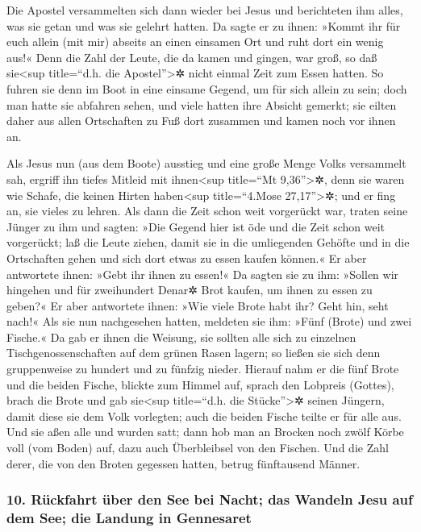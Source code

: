  Die Apostel versammelten sich dann wieder bei Jesus und
berichteten ihm alles, was sie getan und was sie gelehrt hatten.
 Da sagte er zu ihnen: »Kommt ihr für euch allein (mit
mir) abseits an einen einsamen Ort und ruht dort ein wenig aus!« Denn
die Zahl der Leute, die da kamen und gingen, war groß, so daß
sie\textless sup title=``d.h. die Apostel''\textgreater✲ nicht einmal
Zeit zum Essen hatten.  So fuhren sie denn im Boot in
eine einsame Gegend, um für sich allein zu sein;  doch
man hatte sie abfahren sehen, und viele hatten ihre Absicht gemerkt; sie
eilten daher aus allen Ortschaften zu Fuß dort zusammen und kamen noch
vor ihnen an.

 Als Jesus nun (aus dem Boote) ausstieg und eine große
Menge Volks versammelt sah, ergriff ihn tiefes Mitleid mit
ihnen\textless sup title=``Mt 9,36''\textgreater✲, denn sie waren wie
Schafe, die keinen Hirten haben\textless sup title=``4.Mose
27,17''\textgreater✲; und er fing an, sie vieles zu lehren.
 Als dann die Zeit schon weit vorgerückt war, traten
seine Jünger zu ihm und sagten: »Die Gegend hier ist öde und die Zeit
schon weit vorgerückt;  laß die Leute ziehen, damit sie
in die umliegenden Gehöfte und in die Ortschaften gehen und sich dort
etwas zu essen kaufen können.«  Er aber antwortete ihnen:
»Gebt ihr ihnen zu essen!« Da sagten sie zu ihm: »Sollen wir hingehen
und für zweihundert Denar✲ Brot kaufen, um ihnen zu essen zu geben?«
 Er aber antwortete ihnen: »Wie viele Brote habt ihr?
Geht hin, seht nach!« Als sie nun nachgesehen hatten, meldeten sie ihm:
»Fünf (Brote) und zwei Fische.«  Da gab er ihnen die
Weisung, sie sollten alle sich zu einzelnen Tischgenossenschaften auf
dem grünen Rasen lagern;  so ließen sie sich denn
gruppenweise zu hundert und zu fünfzig nieder.  Hierauf
nahm er die fünf Brote und die beiden Fische, blickte zum Himmel auf,
sprach den Lobpreis (Gottes), brach die Brote und gab sie\textless sup
title=``d.h. die Stücke''\textgreater✲ seinen Jüngern, damit diese sie
dem Volk vorlegten; auch die beiden Fische teilte er für alle aus.
 Und sie aßen alle und wurden satt;  dann
hob man an Brocken noch zwölf Körbe voll (vom Boden) auf, dazu auch
Überbleibsel von den Fischen.  Und die Zahl derer, die
von den Broten gegessen hatten, betrug fünftausend Männer.

\hypertarget{ruxfcckfahrt-uxfcber-den-see-bei-nacht-das-wandeln-jesu-auf-dem-see-die-landung-in-gennesaret}{%
\subsubsection{10. Rückfahrt über den See bei Nacht; das Wandeln Jesu
auf dem See; die Landung in
Gennesaret}\label{ruxfcckfahrt-uxfcber-den-see-bei-nacht-das-wandeln-jesu-auf-dem-see-die-landung-in-gennesaret}}

